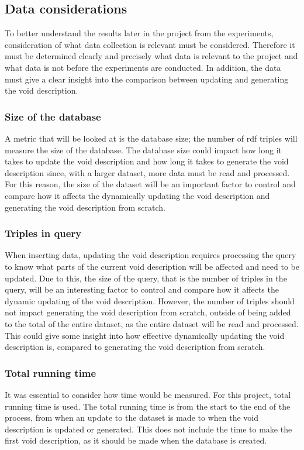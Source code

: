 \subsection{Data considerations}\label{sec:concerns}
To better understand the results later in the project from the experiments, consideration of what data collection is relevant must be considered. Therefore it must be determined clearly and precisely what data is relevant to the project and what data is not before the experiments are conducted. In addition, the data must give a clear insight into the comparison between updating and generating the \gls{void} description.

\subsubsection{Size of the database}
A metric that will be looked at is the database size; the number of \gls{rdf} triples will measure the size of the database. The database size could impact how long it takes to update the \gls{void} description and how long it takes to generate the \gls{void} description since, with a larger dataset, more data must be read and processed. For this reason, the size of the dataset will be an important factor to control and compare how it affects the dynamically updating the \gls{void} description and generating the \gls{void} description from scratch.

\subsubsection{Triples in query}

When inserting data, updating the \gls{void} description requires processing the query to know what parts of the current \gls{void} description will be affected and need to be updated. Due to this, the size of the query, that is the number of triples in the query, will be an interesting factor to control and compare how it affects the dynamic updating of the \gls{void} description. However, the number of triples should not impact generating the \gls{void} description from scratch, outside of being added to the total of the entire dataset, as the entire dataset will be read and processed. This could give some insight into how effective dynamically updating the \gls{void} description is, compared to generating the \gls{void} description from scratch.

\subsubsection{Total running time}
It was essential to consider how time would be measured. For this project, total running time is used. The total running time is from the start to the end of the process, from when an update to the dataset is made to when the \gls{void} description is updated or generated. This does not include the time to make the first \gls{void} description, as it should be made when the database is created.

